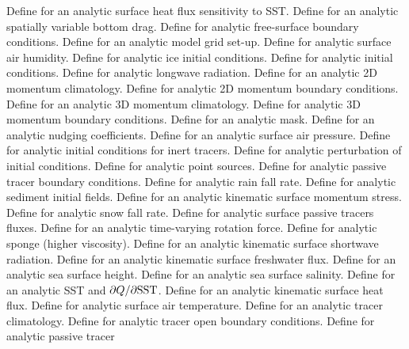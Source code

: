 \begin{klist}
\begin{klist}
      Define for an analytic surface heat flux
  sensitivity to SST.
        Define for an analytic spatially variable
  bottom drag.
       Define for analytic free-surface boundary
  conditions.
        Define for an analytic model grid set-up.
     Define for analytic surface air humidity.
         Define for analytic ice initial conditions.
     Define for analytic initial conditions.
      Define for analytic longwave radiation.
     Define for an analytic 2D momentum climatology.
       Define for analytic 2D momentum boundary
  conditions.
     Define for an analytic 3D momentum climatology.
       Define for analytic 3D momentum boundary
  conditions.
        Define for an analytic mask.
     Define for an analytic nudging
  coefficients.
        Define for an analytic surface air pressure.
     Define for analytic initial conditions for
  inert tracers.
     Define for analytic perturbation of initial
  conditions.
     Define for analytic point sources.
       Define for analytic passive tracer boundary
  conditions.
        Define for analytic rain fall rate.
     Define for analytic sediment initial fields.
      Define for an analytic kinematic surface
  momentum stress.
        Define for analytic snow fall rate.
      Define for analytic surface passive tracers
  fluxes.
    Define for an analytic time-varying rotation
  force.
      Define for analytic sponge (higher viscosity).
      Define for an analytic kinematic surface
  shortwave radiation.
      Define for an analytic kinematic surface
  freshwater flux.
      Define for an analytic sea surface height.
      Define for an analytic sea surface salinity.
      Define for an analytic SST and
  $\partial Q /\partial {\rm SST}$.
      Define for an analytic kinematic surface
  heat flux.
        Define for analytic surface air temperature.
      Define for an analytic tracer climatology.
       Define for analytic tracer open boundary
  conditions.
     Define for analytic passive tracer

\end{klist}
\end{klist}
